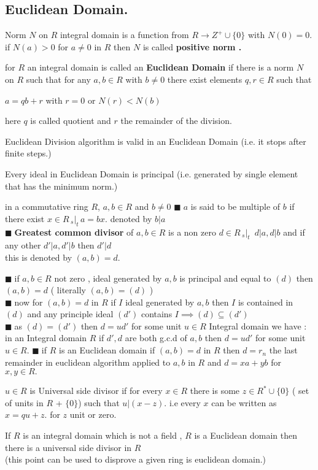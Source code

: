 \documentclass[11pt]{extarticle}
\newcommand{\ra}{\rightarrow}
\newcommand{\snote}[1]{{\footnotesize(#1)}}
\newcommand{\st}{\,{}_{s}|_t\,}
\newcommand{\tbx}[2][]{
	\begin{tcolorbox}[enhanced,breakable,size=small,colback=black!2!white,title={#1},arc is angular, arc=1.5mm,drop fuzzy shadow]
		#2
	\end{tcolorbox}
}
\newcommand{\y}{$\blacksquare\;$}
\begin{document}
\begin{multicols}{2}
	
		
		\section{Euclidean Domain.}

\tbx[\textbf{Norm} $ N $]{Norm $ N $ on $ R $ integral domain is a function from $ R\ra Z^+\cup \{0\} $ with $ N(0)=0. $\\
			if $ N(a)>0 $ for $ a\neq 0 $ in $ R $ then $ N $ is called\textbf{ positive norm .}
			} 
\tbx{for $ R $ an integral domain is called an \textbf{Euclidean Domain} if there is a norm $ N $ on $ R $ such that for any $ a,b\in R $ with $ b \neq 0$ there exist elements $ q,r\in R $ such that 
			\begin{center}
				$ a=qb+r $ with $ r=0 $ or $ N(r)<N(b) $
			\end{center} here $ q $ is called quotient and $ r $ the remainder of the division.
			} 
\tbx{Euclidean Division algorithm is valid in an Euclidean Domain \snote{i.e. it stops after finite steps.}
			} 
\tbx{Every ideal in Euclidean Domain is principal \snote{i.e. generated by single element that has the minimum norm.}
			} 
\tbx{in a commutative ring $ R $, $ a,b\in R $ and $ b\neq 0$
			\y $ a $ is said to be multiple of $ b $ if there exist $ x\in R \st a=bx. $ denoted by $ b|a $ \\
			\y \textbf{Greatest common divisor } of $ a,b\in R $ is a non zero $ d \in R \st  $ 
			$ d|a,d|b $ and if any other $ d'|a,d'|b $ then $ d'|d $\\
			this is denoted by $ (a,b)=d .$
			} 
\tbx[Properties of Gcd]
{\y if $ a,b \in R $ not zero , ideal generated by $ a,b $ is principal and equal to $ (d) $ then $ (a,b)=d $
			\snote{ literally $ (a,b)=(d) $ }\\
\y now for $ (a,b)=d $ in $ R $ if $ I $ ideal generated by $ a,b $ then $ I $ is contained in $ (d) $ and any principle ideal $ (d') $ contains $ I \implies (d)\subseteq (d')$\\
\y as $ (d)=(d') $ then $ d=ud' $ for some unit $ u\in R $ Integral domain we have :\\
			in an Integral domain $ R $ if $ d',d $ are both g.c.d of $ a,b $ then $ d=ud' $ for some unit $ u\in R .$
\y if $ R $ is an Euclidean domain if $ (a,b) =d$ in $ R $ then $ d=r_n $ the last remainder in euclidean algorithm applied to $ a,b $ in $ R $ and $ d=xa+yb $ for $ x,y\in R .$
			} 
\tbx[\textbf{Universal side divisor}]{$ u\in  R$ is Universal side divisor if  for every $x\in R  $ there is some $ z\in R^*\cup \{0\} $ 
			\snote{ set of units in $ R $ + $ \{0\} $} such that $ u|(x-z). $ i.e every $ x $ can be written as $ x=qu+z. $ for $ z $ unit or zero.
			} 
\tbx[Test for not Euclidean domain]{If $ R $ is an integral domain which is not a field , $ R $ is a Euclidean domain then there is a universal side divisor in $ R $ \\
			\snote{this point can be used to disprove a given ring is euclidean domain.}}
		

\end{multicols}
\end{document}
